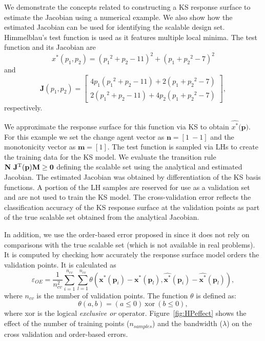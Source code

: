 We demonstrate the concepts related to constructing a \ac{KS} response surface to estimate the Jacobian using a numerical example. We also show how the estimated Jacobian can be used for identifying the scalable design set. Himmelblau's test function is used as it features multiple local minima. The test function and its Jacobian are
\begin{displaymath}
		{x}^*(p_1,p_2) = ({p_1}^{2}+{p_2}-11)^{2}+({p_1}+{p_2}^{2}-7)^{2} 
		\end{displaymath}
		and
	\begin{displaymath}	
		\mathbf{J}(p_1,p_2) = \begin{bmatrix}
			4{p_1}({p_1}^2 + {p_2} - 11) + 2({p_1} + {p_2}^2 -7) \\ 
			2({p_1}^2 + {p_2} - 11) + 4{p_2}({p_1} + {p_2}^2 -7) 
	\end{bmatrix},
	\end{displaymath}
	respectively.%

We approximate the response surface for this function via \ac{KS} to obtain $\hat{{x}^*}(\mathbf{p)}$. For this example we set the change agent vector as $\mathbf{n} = \left[1~-1\right]$ and the monotonicity vector as $\mathbf{m} = \left[1\right]$. The test function is sampled via \acp{LH} to create the training data for the \ac{KS} model. We evaluate the transition rule $\mathbf{N}~\mathbf{J}^{\text T}(\mathbf{p})\mathbf{M} \ge \mathbf{0}$ defining the scalable set using the analytical and estimated Jacobian. The estimated Jacobian was obtained by differentiation of the \ac{KS} basis functions. A portion of the \ac{LH} samples are reserved for use as a validation set and are not used to train the \ac{KS} model. The cross-validation error reflects the classification accuracy of the \ac{KS} response surface at the validation points as part of the true scalable set obtained from the analytical Jacobian.

In addition, we use the order-based error proposed in \cite{Audet2018} since it does not rely on comparisons with the true scalable set (which is not available in real problems). It is computed by checking how accurately the response surface model orders the validation points. It is calculated as 
%
\begin{equation}
    \label{eq:oeobjective}
	\varepsilon_{OE} = \frac{1}{n_{cv}^2} \sum_{i=1}^{n_{cv}} \sum_{l=1}^{n_{cv}} \theta\left(\mathbf{x}^*(\mathbf{p}_i) - \mathbf{x}^*(\mathbf{p}_l),\hat{\mathbf{x}^*}(\mathbf{p}_i) - \hat{\mathbf{x}^*}(\mathbf{p}_l)\right),
\end{equation}
%
where $n_{cv}$ is the number of validation points. The function $\theta$ is defined as:
%
\begin{equation}
    \label{eq:theta}
    \theta\left(a,b\right) = \left(a \le 0\right)~\textrm{xor}~\left(b \le 0\right),
\end{equation}
%
where xor is the logical \textit{exclusive or} operator.
Figure~\ref{fig:HPeffect} shows the effect of the number of training points ($n_{samples}$) and the bandwidth ($\lambda$) on the cross validation and order-based errors.

